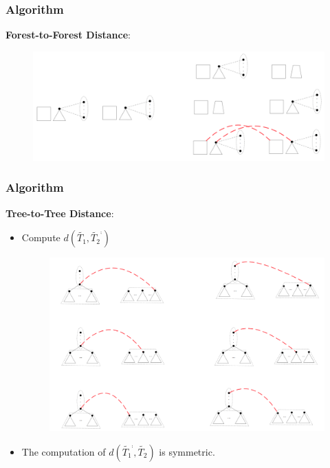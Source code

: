 \documentclass{beamer}
\begin{document}
\begin{frame}
\frametitle{Algorithm}
\textbf{Forest-to-Forest Distance}:
\begin{figure}
	\includegraphics[width=1.0\linewidth]{forestforestcompressed}
	\centering
\end{figure}

\end{frame}
\begin{frame}
\frametitle{Algorithm}
\textbf{Tree-to-Tree Distance}:
\begin{itemize}
\item Compute $d(\widetilde{T_1}, \widetilde{T_2}^{\comp})$
\begin{figure}
	\includegraphics[width=0.85\linewidth]{TreeInitial}
	\centering
\end{figure}
\item The computation of $d(\widetilde{T_1}^{\comp}, \widetilde{T_2})$ is symmetric.
\end{itemize}
\end{frame}
\end{document}
